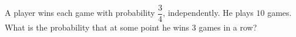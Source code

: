A player wins each game with probability $\dfrac34$, independently. He plays $10$ games. What is the probability that at some point he wins $3$ games in a row?
